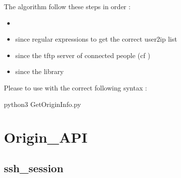 \documentclass[letterpaper,10pt,english]{sphinxmanual}
\begin{document}
\sphinxAtStartPar
The algorithm follow these steps in order :
\begin{itemize}
\item {} 
\sphinxAtStartPar
{}

\item {} 
\sphinxAtStartPar
{} since regular expressions to get the correct user2ip list

\item {} 
\sphinxAtStartPar
{} since the tftp server of connected people (cf   )

\item {} 
\sphinxAtStartPar
{} since the  library

\end{itemize}

\sphinxAtStartPar
Please to use with the correct following syntax :

\begin{sphinxVerbatim}[commandchars=\\\{\}]
python3 Get\PYGZus{}Origin\PYGZus{}Info.py
\end{sphinxVerbatim}

\sphinxstepscope


\chapter{Origin\_API}
\label{\detokenize{Origin_API:origin-api}}\label{\detokenize{Origin_API::doc}}
\sphinxAtStartPar
{} 

\sphinxAtStartPar
{}  

\sphinxAtStartPar
{} 

\sphinxstepscope

\newpage
\section{ssh\_session}
\label{\detokenize{OA/ssh_session:ssh-session}}\label{\detokenize{OA/ssh_session::doc}}
\begin{sphinxVerbatim}[commandchars=\\\{\}]
 
\end{sphinxVerbatim}
\end{document}
